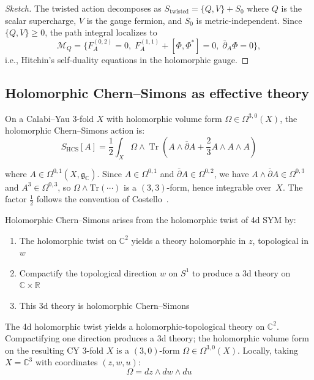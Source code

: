 \begin{proof}[Sketch]
The twisted action decomposes as $S_{\mathrm{twisted}} = \{Q, V\} + S_0$ where $Q$ is the scalar supercharge, $V$ is the gauge fermion, and $S_0$ is metric-independent.  Since $\{Q, V\} \geq 0$, the path integral localizes to
\[\mathcal{M}_Q = \{F_{A}^{(0,2)} = 0,\; F_A^{(1,1)} + [\Phi, \Phi^*] = 0,\; \bar{\partial}_A \Phi = 0\},\]
i.e., Hitchin's self-duality equations in the holomorphic gauge.
\end{proof}

\subsection{Holomorphic Chern--Simons as effective theory}

\begin{definition}
On a Calabi--Yau 3-fold $X$ with holomorphic volume form $\Omega \in \Omega^{3,0}(X)$, the
holomorphic Chern--Simons action is:
\[S_{\text{HCS}}[A] = \frac{1}{2}\int_{X} \Omega \wedge \operatorname{Tr}\left(A
\wedge \bar{\partial} A + \frac{2}{3} A \wedge A \wedge A\right)\]

where $A \in \Omega^{0,1}(X, \mathfrak{g}_{\mathbb{C}})$.  Since $A \in \Omega^{0,1}$ and $\bar\partial A \in \Omega^{0,2}$, we have $A \wedge \bar\partial A \in \Omega^{0,3}$ and $A^3 \in \Omega^{0,3}$, so $\Omega \wedge \text{Tr}(\cdots)$ is a $(3,3)$-form, hence integrable over~$X$.  The factor $\frac{1}{2}$ follows the convention of Costello~\cite{costello-renormalization}.
\end{definition}

\begin{theorem}\label{thm:hcs-dimensional-reduction}
Holomorphic Chern--Simons \cite{costello-renormalization} arises from the holomorphic twist of 4d SYM by:
\begin{enumerate}
\item The holomorphic twist on $\mathbb{C}^2$ yields a theory holomorphic in $z$, topological in~$w$
\item Compactify the topological direction $w$ on $S^1$ to produce a 3d theory on $\mathbb{C} \times \mathbb{R}$
\item This 3d theory is holomorphic Chern--Simons
\end{enumerate}

The 4d holomorphic twist yields a holomorphic-topological theory on $\mathbb{C}^2$. Compactifying one direction produces a 3d theory; the holomorphic volume form on the resulting CY 3-fold $X$ is a $(3,0)$-form $\Omega \in \Omega^{3,0}(X)$.  Locally, taking $X = \mathbb{C}^3$ with coordinates $(z, w, u)$:
\[\Omega = dz \wedge dw \wedge du\]
\end{theorem}

